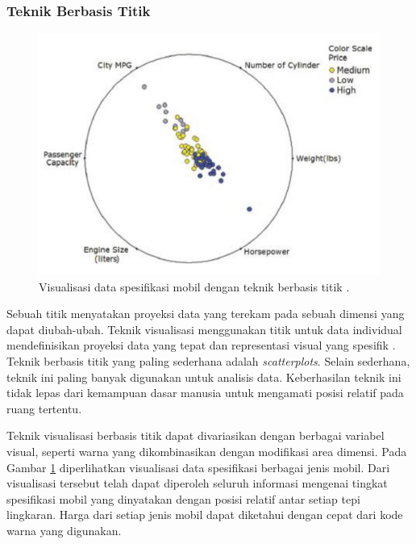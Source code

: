 \subsubsection{Teknik Berbasis Titik}
\begin{figure}[t!]
    \centering
    \includegraphics[width=12cm]{Gambar/datamobil-visual-titik.jpg}
    \caption{Visualisasi data spesifikasi mobil dengan teknik berbasis titik \cite{buku_visual}.}
    \label{fig:datamobil-visual-titik}
\end{figure}
Sebuah titik menyatakan proyeksi data yang terekam pada sebuah dimensi yang dapat diubah-ubah. Teknik visualisasi menggunakan titik untuk data individual mendefinisikan proyeksi data yang tepat dan representasi visual yang spesifik \cite{buku_visual}. Teknik berbasis titik yang paling sederhana adalah \textit{scatterplots}. Selain sederhana, teknik ini paling banyak digunakan untuk analisis data. Keberhasilan teknik ini tidak lepas dari kemampuan dasar manusia untuk mengamati posisi relatif pada ruang tertentu. \par
Teknik visualisasi berbasis titik dapat divariasikan dengan berbagai variabel visual, seperti warna yang dikombinasikan dengan modifikasi area dimensi. Pada Gambar \ref{fig:datamobil-visual-titik} diperlihatkan visualisasi data spesifikasi berbagai jenis mobil. Dari visualisasi tersebut telah dapat diperoleh seluruh informasi mengenai tingkat spesifikasi mobil yang dinyatakan dengan posisi relatif antar setiap tepi lingkaran. Harga dari setiap jenis mobil dapat diketahui dengan cepat dari kode warna yang digunakan. \par
